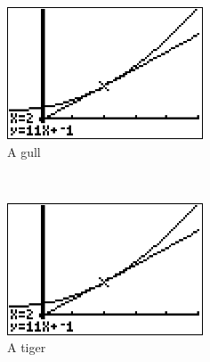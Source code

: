 \documentclass[a4paper, openany, 12pt]{maatext}
\numberwithin{section}{chapter}
\numberwithin{equation}{chapter}
\begin{document}
\begin{figure}
    \centering
    \begin{subfigure}[b]{0.3\textwidth}
        \includegraphics[width=\textwidth]{./assets/20170509-123642.png}
        \caption{A gull}
        \label{fig:gull}
    \end{subfigure}
    ~ %
    \begin{subfigure}[b]{0.3\textwidth}
        \includegraphics[width=\textwidth]{./assets/20170509-123642.png}
        \caption{A tiger}
        \label{fig:tiger}
    \end{subfigure}
    ~ %
    \begin{subfigure}[b]{0.3\textwidth}

\end{subfigure}
\end{figure}
\end{document}
